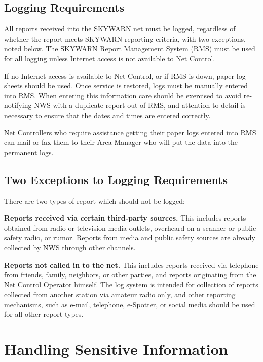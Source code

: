 \documentclass[pdflatex,letterpaper,twoside,12pt]{book}
\begin{document}
\subsection{Logging Requirements}

All reports received into the SKYWARN net must be logged, regardless of whether the report meets SKYWARN reporting criteria, with two exceptions, noted below.  The SKYWARN Report Management System (RMS) must be used for all logging unless Internet access is not available to Net Control.

If no Internet access is available to Net Control, or if RMS is down, paper log sheets should be used. Once service is restored, logs must be manually entered into RMS.  When entering this information care should be exercised to avoid re-notifying NWS with a duplicate report out of RMS, and attention to detail is necessary to ensure that the dates and times are entered correctly.

Net Controllers who require assistance getting their paper logs entered into RMS can mail or fax them to their Area Manager who will put the data into the permanent logs.

\subsection{Two Exceptions to Logging Requirements}\label{two-exceptions}

There are two types of report which should not be logged:

\textbf{Reports received via certain third-party sources.}  This includes reports obtained from radio or television media outlets, overheard on a scanner or public safety radio, or rumor.  Reports from media and public safety sources are already collected by NWS through other channels.

\textbf{Reports not called in to the net.}  This includes reports received via telephone from friends, family, neighbors, or other parties, and reports originating from the Net Control Operator himself.  The log system is intended for collection of reports collected from another station via amateur radio only, and other reporting mechanisms, such as e-mail, telephone, e-Spotter, or social media should be used for all other report types.


\section{Handling Sensitive Information}\label{handling-sensitive}
\end{document}
